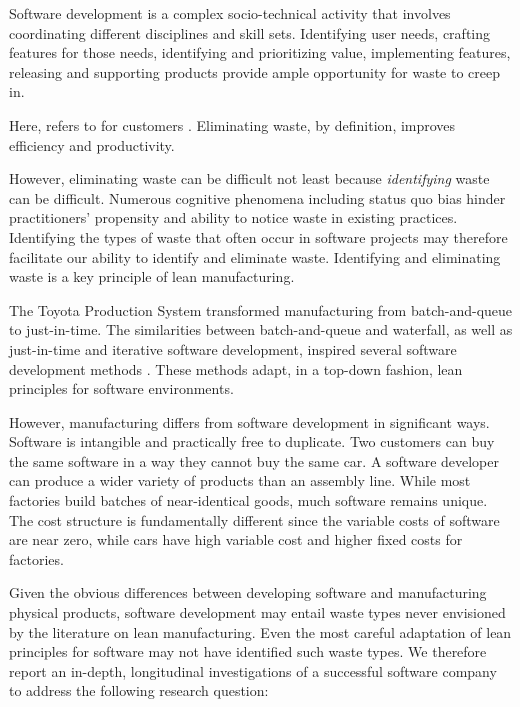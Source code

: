 Software development is a complex socio-technical activity that involves coordinating different disciplines and skill sets. Identifying user needs, crafting features for those needs, identifying and prioritizing value, implementing features, releasing and supporting products provide ample opportunity for waste to creep in. 

Here,  refers to  for customers \cite{WomackLeanThinking}. Eliminating waste, by definition, improves efficiency and productivity. 

However, eliminating waste can be difficult not least because \textit{identifying} waste can be difficult.  Numerous cognitive phenomena including status quo bias \cite{JostDecadeOfSystemJustification} hinder practitioners' propensity and ability to notice waste in existing practices. Identifying the types of waste that often occur in software projects may therefore facilitate our ability to identify and eliminate waste. Identifying and eliminating waste is a key principle of lean manufacturing. 

The Toyota Production System \cite{OhnoToyotaProductionSystem, ShingoToyotaProductionSystem} transformed manufacturing from batch-and-queue to just-in-time. The similarities between batch-and-queue and waterfall, as well as just-in-time and iterative software development, inspired several software development methods \cite{PoppendieckLeanSoftwareDevelopment, AndersonKanban}. These methods adapt, in a top-down fashion, lean principles for software environments. 

However, manufacturing differs from software development in significant ways. Software is intangible and practically free to duplicate. Two customers can buy the same software in a way they cannot buy the same car. A software developer can produce a wider variety of products than an assembly line. While most factories build batches of near-identical goods, much software remains unique. The cost structure is fundamentally different since the variable costs of software are near zero, while cars have high variable cost and higher fixed costs for factories. 

Given the obvious differences between developing software and manufacturing physical products, software development may entail waste types never envisioned by the literature on lean manufacturing. Even the most careful adaptation of lean principles for software may not have identified such waste types. We therefore report an in-depth, longitudinal investigations of a successful software company to address the following research question: 

